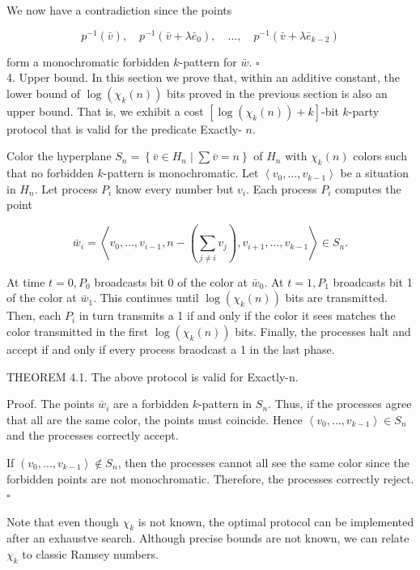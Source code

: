\documentclass[10pt]{article}
\begin{document}
We now have a contradiction since the points

$$
p^{-1}(\bar{v}), \quad p^{-1}\left(\bar{v}+\lambda \bar{e}_{0}\right), \quad \ldots, \quad p^{-1}\left(\bar{v}+\lambda \bar{e}_{k-2}\right)
$$

form a monochromatic forbidden $k$-pattern for $\bar{w}$. \(\square\)\\
4. Upper bound. In this section we prove that, within an additive constant, the lower bound of $\log \left(\chi_{k}(n)\right)$ bits proved in the previous section is also an upper bound. That is, we exhibit a cost $\left[\log \left(\chi_{k}(n)\right)+k\right]$-bit $k$-party protocol that is valid for the predicate Exactly- $n$.

Color the hyperplane $S_{n}=\left\{\bar{v} \in H_{n} \mid \sum \bar{v}=n\right\}$ of $H_{n}$ with $\chi_{k}(n)$ colors such that no forbidden $k$-pattern is monochromatic. Let $\left\langle v_{0}, \ldots, v_{k-1}\right\rangle$ be a situation in $H_{n}$. Let process $P_{i}$ know every number but $v_{i}$. Each process $P_{i}$ computes the point

$$
\bar{w}_{i}=\left\langle v_{0}, \ldots, v_{i-1}, n-\left(\sum_{j \neq i} v_{j}\right), v_{i+1}, \ldots, v_{k-1}\right\rangle \in S_{n} .
$$

At time $t=0, P_{0}$ broadcasts bit 0 of the color at $\bar{w}_{0}$. At $t=1, P_{1}$ broadcasts bit 1 of the color at $\bar{w}_{1}$. This continues until $\log \left(\chi_{k}(n)\right)$ bits are transmitted. Then, each $P_{i}$ in turn transmits a 1 if and only if the color it sees matches the color transmitted in the first $\log \left(\chi_{k}(n)\right)$ bits. Finally, the processes halt and accept if and only if every process braodcast a 1 in the last phase.

THEOREM 4.1. The above protocol is valid for Exactly-n.

Proof. The points $\bar{w}_{i}$ are a forbidden $k$-pattern in $S_{n}$. Thus, if the processes agree that all are the same color, the points must coincide. Hence $\left\langle v_{0}, \ldots, v_{k-1}\right\rangle \in S_{n}$ and the processes correctly accept.

If $\left(v_{0}, \ldots, v_{k-1}\right\rangle \notin S_{n}$, then the processes cannot all see the same color since the forbidden points are not monochromatic. Therefore, the processes correctly reject. \(\square\)

Note that even though $\chi_{k}$ is not known, the optimal protocol can be implemented after an exhaustve search. Although precise bounds are not known, we can relate $\chi_{k}$ to classic Ramsey numbers.
\end{document}
